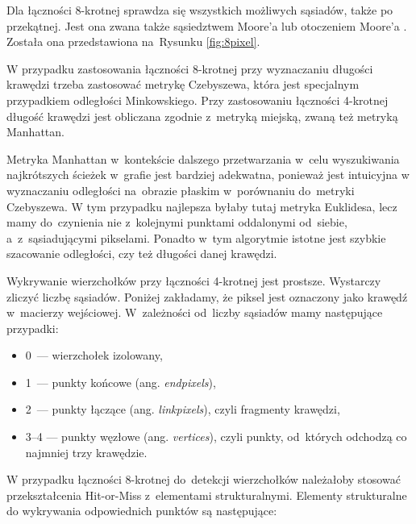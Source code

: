 \documentclass[a4paper,11pt,twoside,openright]{report}
\theoremstyle{definition}
\begin{document}
Dla łączności 8-krotnej sprawdza się wszystkich możliwych sąsiadów, także po
przekątnej. Jest ona zwana także sąsiedztwem Moore'a lub otoczeniem Moore'a \cite{Moore}.
Została ona przedstawiona na~Rysunku \ref{fig:8pixel}.


W przypadku zastosowania łączności 8-krotnej przy wyznaczaniu długości krawędzi
trzeba zastosować metrykę Czebyszewa, która jest specjalnym przypadkiem
odległości Minkowskiego. Przy zastosowaniu łączności 4-krotnej długość krawędzi
jest obliczana zgodnie z~metryką miejską, zwaną też metryką Manhattan.

Metryka Manhattan w~kontekście dalszego przetwarzania w~celu wyszukiwania
najkrótszych ścieżek w~grafie jest bardziej adekwatna, ponieważ jest intuicyjna
w wyznaczaniu odległości na~obrazie płaskim w~porównaniu do~metryki Czebyszewa.
W tym przypadku najlepsza byłaby tutaj metryka Euklidesa, lecz mamy do~czynienia
nie z~kolejnymi punktami oddalonymi od~siebie, a~z~sąsiadującymi pikselami.
Ponadto w~tym algorytmie istotne jest szybkie szacowanie odległości, czy też
długości danej krawędzi.

Wykrywanie wierzchołków przy łączności 4-krotnej jest prostsze. Wystarczy zliczyć
liczbę sąsiadów. Poniżej zakładamy, że piksel jest oznaczony jako krawędź w~macierzy
wejściowej. W~zależności od~liczby sąsiadów mamy następujące przypadki:
\begin{itemize}[noitemsep]
\item 0~--- wierzchołek izolowany,
\item 1~--- punkty końcowe (ang. \textit{endpixels}),
\item 2~--- punkty łączące (ang. \textit{linkpixels}), czyli fragmenty krawędzi,
\item 3--4 --- punkty węzłowe (ang. \textit{vertices}), czyli punkty, od~których odchodzą
co najmniej trzy krawędzie.
\end{itemize}

W przypadku łączności 8-krotnej do~detekcji wierzchołków należałoby stosować
przekształcenia Hit-or-Miss z~elementami strukturalnymi. Elementy strukturalne
do wykrywania odpowiednich punktów są następujące:
\end{document}
